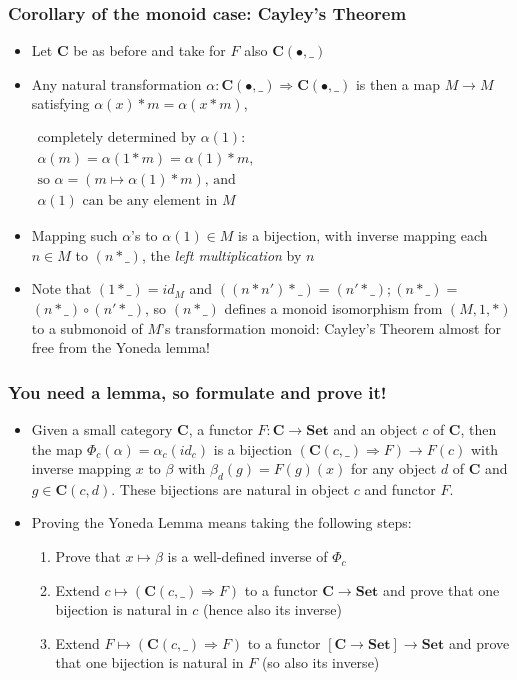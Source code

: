 \documentclass[handout]{beamer}
\newcommand{\To}{\Rightarrow}
\newcommand{\bfsf}[1]{{\boldsymbol{#1}}}
\newcommand{\Set}{\bfsf{Set}}
\newcommand{\CC}{\bfsf{C}}
\begin{document}
\frame
  {   
    \frametitle{Corollary of the monoid case: Cayley's Theorem}\label{Yon:MonCayley}

 \begin{itemize}[<+->]
\item Let $\CC$ be as before and take for $F$ also $\CC(\bullet,\_)$
\item Any natural transformation $\alpha: \CC(\bullet,\_)\To \CC(\bullet,\_)$ is
then a map $M\to M$ satisfying $\alpha(x)*m = \alpha(x*m)$,
$\begin{array}{l}%
\text{completely determined by $\alpha(1)$:}\\
\text{$\alpha(m) = \alpha(1*m)   = \alpha(1)*m$,}\\
\text{so $\alpha = (m\mapsto \alpha(1)*m)$, and}\\ %
\text{$\alpha(1)$ can be any element in $M$}
\end{array}$
\item Mapping such $\alpha$'s to $\alpha(1)\in M$ is a bijection, with inverse
mapping each $n\in M$ to $(n*\_)$, the \emph{left multiplication} by $n$
\item Note that $(1*\_) = id_M$ and 
$((n*n')*\_) = (n'*\_); (n*\_)=$\\$ (n*\_)\circ (n'*\_)$, so
$(n*\_)$ defines a monoid isomorphism  from $(M,1,*)$
to a submonoid of $M$'s transformation monoid: Cayley's Theorem
almost for free from the Yoneda lemma!
 \end{itemize}

}

\frame
  {   
    \frametitle{You need a lemma, so formulate and prove it!}\label{Yon:Intro}

 \begin{itemize}[<+->]
\item Given a small category $\CC$, a functor $F:\CC\to\Set$ and an
object $c$ of $\CC$, then the map $\Phi_c(\alpha) = \alpha_c(id_c)$ is
a bijection $(\CC(c,\_)\To F)\to F(c)$ with inverse mapping $x$ to $\beta$
with $\beta_d(g)=F(g)(x)$ for any object $d$ of $\CC$ and $g\in\CC(c,d)$.
These bijections are natural in object $c$ and functor $F$.
\item Proving the Yoneda Lemma means taking the following steps:
 \begin{enumerate}
    \item Prove that $x\mapsto\beta$ is a well-defined inverse of $\Phi_c$
    \item Extend $c\mapsto(\CC(c,\_)\To F)$ to a functor $\CC\to\Set$ and
prove that one bijection is natural in $c$ (hence also its inverse)
    \item Extend $F\mapsto(\CC(c,\_)\To F)$ to a functor $[\CC\to\Set]\to\Set$ and
prove that one bijection is natural in $F$ (so also its inverse)
   \end{enumerate}
 \end{itemize}

 }
\end{document}
